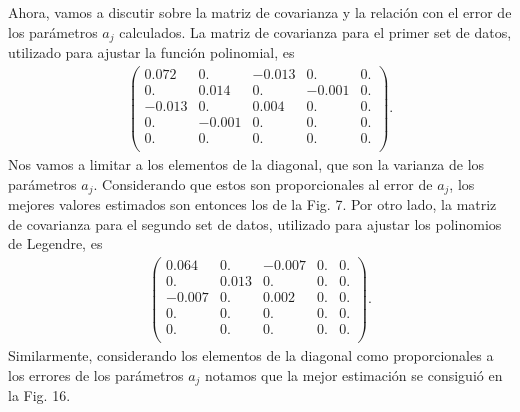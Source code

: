 \documentclass[11pt,letterpaper]{article}
\begin{document}
Ahora, vamos a discutir sobre la matriz de covarianza y la relación 
con el error de los parámetros $a_j$ calculados. La matriz 
de covarianza para el primer set de datos, utilizado para ajustar
la función polinomial, es
\begin{align}
\left(
\begin{array}{ccccc}
 0.072 & 0. & -0.013 & 0. & 0. \\
 0. & 0.014 & 0. & -0.001 & 0. \\
 -0.013 & 0. & 0.004 & 0. & 0. \\
 0. & -0.001 & 0. & 0. & 0. \\
 0. & 0. & 0. & 0. & 0. \\
\end{array}
\right).
\end{align}
Nos vamos a limitar a los elementos de la diagonal, que son la 
varianza de los parámetros $a_j$. Considerando que estos son proporcionales
al error de $a_j$, los mejores valores estimados son entonces los de 
la Fig. 7.
Por otro lado, la matriz de covarianza para el segundo set de datos, 
utilizado para ajustar los polinomios de Legendre, es
\begin{align}
\left(
\begin{array}{ccccc}
 0.064 & 0. & -0.007 & 0. & 0. \\
 0. & 0.013 & 0. & 0. & 0. \\
 -0.007 & 0. & 0.002 & 0. & 0. \\
 0. & 0. & 0. & 0. & 0. \\
 0. & 0. & 0. & 0. & 0. \\
\end{array}
\right).
\end{align}
Similarmente, considerando los elementos de la diagonal como proporcionales
a los errores de los parámetros $a_j$ notamos que la mejor estimación
se consiguió en la Fig. 16.
\end{document}
